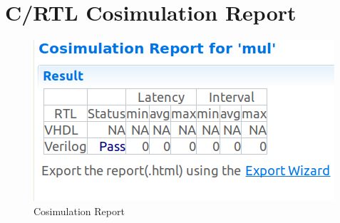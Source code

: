 \documentclass{article}
\begin{document}
\section{C/RTL Cosimulation Report}
\vspace{1cm}
\begin{figure}[h]
    \centering
\includegraphics[width=\columnwidth]{figs/Cosim_report.png}
    \caption{Cosimulation Report}
    \label{fig:my_label}
\end{figure}
\end{document}
